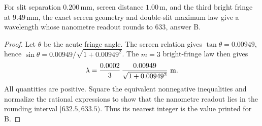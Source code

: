 \begin{theorem}
\label{thm:physics:phyx_mini_0046:target}
For slit separation \(0.200\,\mathrm{mm}\), screen distance
\(1.00\,\mathrm m\), and the third bright fringe at \(9.49\,\mathrm{mm}\),
the exact screen geometry and double-slit maximum law give a wavelength whose
nanometre readout rounds to \(633\), answer B.
\end{theorem}
\begin{proof}
Let \(\theta\) be the acute fringe angle.  The screen relation gives
\(\tan\theta=0.00949\), hence
\(\sin\theta=0.00949/\sqrt{1+0.00949^2}\).  The \(m=3\) bright-fringe law
then gives
\[
 \lambda=\frac{0.0002}{3}\,
   \frac{0.00949}{\sqrt{1+0.00949^2}}\ {\rm m}.
\]
All quantities are positive.  Square the equivalent nonnegative inequalities
and normalize the rational expressions to show that the nanometre readout
lies in the rounding interval \([632.5,633.5)\).  Thus its nearest integer is
the value printed for B.
\end{proof}

